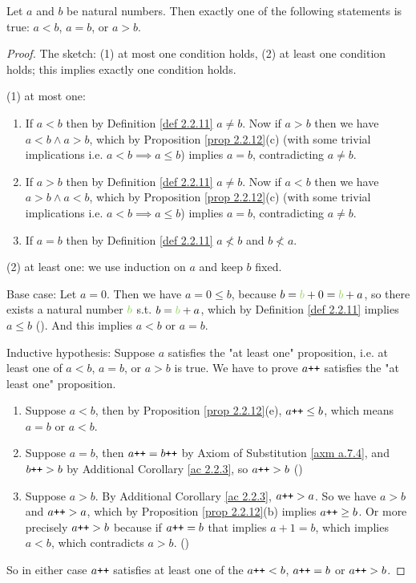 \begin{proposition} \label{prop 2.2.13}
Let \(a\) and \(b\) be natural numbers. Then exactly one of the following statements is true: \(a < b\), \(a = b\), or \(a > b\).
\end{proposition}
\begin{proof}
The sketch: (1) at most one condition holds, (2) at least one condition holds; this implies exactly one condition holds.

(1) at most one:
    \begin{enumerate}
        \item If \(a < b\) then by Definition \ref{def 2.2.11} \(a \neq b\). Now if \(a > b\) then we have \(a < b \land a > b\), which by Proposition \ref{prop 2.2.12}(c) (with some trivial implications i.e. \(a < b \implies a \leq b\)) implies \(a = b\), contradicting \(a \neq b\).
        \item If \(a > b\) then by Definition \ref{def 2.2.11} \(a \neq b\). Now if \(a < b\) then we have \(a > b \land a < b\), which by Proposition \ref{prop 2.2.12}(c) (with some trivial implications i.e. \(a < b \implies a \leq b\)) implies \(a = b\), contradicting \(a \neq b\).
        \item If \(a = b\) then by Definition \ref{def 2.2.11} \(a \not < b \) and \(b \not < a\).
    \end{enumerate}

(2) at least one: we use induction on \(a\) and keep \(b\) fixed.

Base case: Let \(a = 0\). Then we have \(a = 0 \leq b\), because \(b = \GREEN{b} + 0 = \GREEN{b} + a\), so there exists a natural number \(\GREEN{b}\) s.t. \(b = \GREEN{b} + a\), which by Definition \ref{def 2.2.11} implies \(a \leq b\) (). And this implies \(a < b\) or \(a = b\).

Inductive hypothesis: Suppose \(a\) satisfies the "at least one" proposition, i.e. at least one of \(a < b\), \(a = b\), or \(a > b\) is true. We have to prove \(a\texttt{++}\) satisfies the "at least one" proposition.
    \begin{enumerate}
        \item Suppose \(a < b\), then by Proposition \ref{prop 2.2.12}(e), \(a\texttt{++} \leq b\), which means \(a = b\) or \(a < b\).
        \item Suppose \(a = b\), then \(a\texttt{++} = b\texttt{++}\) by Axiom of Substitution \ref{axm a.7.4}, and \(b\texttt{++} > b\) by Additional Corollary \ref{ac 2.2.3}, so \(a\texttt{++} > b\) ()
        \item Suppose \(a > b\). By Additional Corollary \ref{ac 2.2.3}, \(a\texttt{++} > a\). So we have \(a > b\) and \(a\texttt{++} > a\), which by Proposition \ref{prop 2.2.12}(b) implies \(a\texttt{++} \geq b\). Or more precisely \(a\texttt{++} > b\) because if \(a\texttt{++} = b\) that implies \(a + 1 = b\), which implies \(a < b\), which contradicts \(a > b\). ()
    \end{enumerate}
So in either case \(a\texttt{++}\) satisfies at least one of the \(a\texttt{++} < b\), \(a\texttt{++} = b\) or \(a\texttt{++} > b\).
\end{proof}

